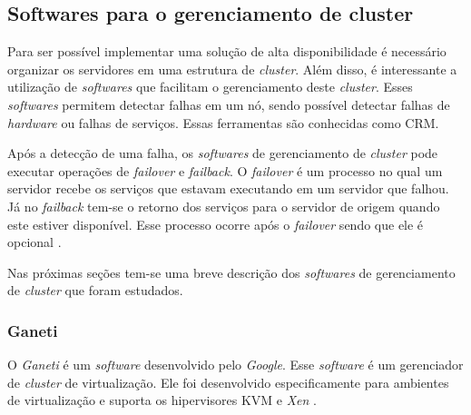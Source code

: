 \subsection{Softwares para o gerenciamento de cluster}
\label{section:toolcluster}

Para ser possível implementar uma solução de alta disponibilidade é necessário organizar os servidores em uma estrutura de \textit{cluster}.
Além disso, é interessante a utilização de \textit{softwares} que facilitam o gerenciamento deste \textit{cluster}. Esses \textit{softwares} 
permitem detectar falhas em um nó, sendo possível detectar falhas de \textit{hardware} ou falhas de serviços. 
Essas ferramentas são conhecidas como \ac{CRM}. 

Após a detecção de uma falha, os \textit{softwares} de gerenciamento de \textit{cluster} pode executar operações de \textit{failover} e 
\textit{failback}. O \textit{failover} é um processo no qual um servidor recebe os serviços que estavam executando em um servidor que falhou. 
Já no \textit{failback} tem-se o retorno dos serviços para o servidor de origem quando este estiver disponível. Esse processo ocorre após o 
\textit{failover} sendo que ele é opcional \cite{bassan2008}.

Nas próximas seções tem-se uma breve descrição dos \textit{softwares} de gerenciamento de \textit{cluster} que foram estudados.


\subsubsection{Ganeti}
\label{section:ganeti}
O \textit{Ganeti} \cite{ganeti} é um \textit{software} desenvolvido pelo \textit{Google}. Esse \textit{software} é um gerenciador de 
\textit{cluster} de virtualização. Ele foi desenvolvido especificamente para ambientes de virtualização e suporta os hipervisores 
\ac{KVM} \cite{kvm} e \textit{Xen} \cite{xen}. 


